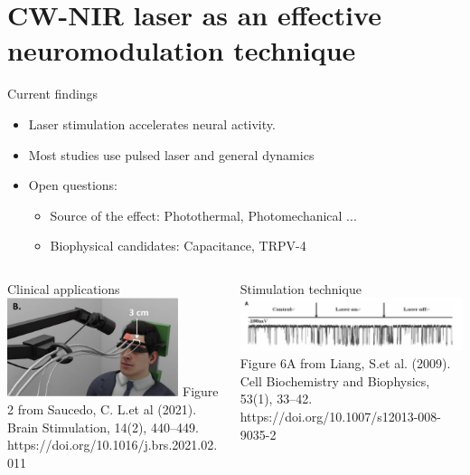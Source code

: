 \documentclass[aspectratio=43]{beamer}
\begin{document}
\section[CW-NIR Neuromodulation]{CW-NIR laser as an effective neuromodulation technique}
\begin{frame}{Current findings}
	\begin{itemize}
		\item{Laser stimulation accelerates neural activity.}
		\item{Most studies use pulsed laser and general dynamics}
		\item{Open questions:}
		\begin{itemize}
			\item Source of the effect: Photothermal, Photomechanical ...
			\item Biophysical candidates: Capacitance, TRPV-4 
		\end{itemize}
	\end{itemize}
	\vspace{10pt}
	\begin{columns}
		\begin{column}{0.5\textwidth}
			\centering
			Clinical applications\\
			\includegraphics[width=0.8\textwidth]{Images/saucedo.png} \tiny{Figure 2 from Saucedo, C. L.et al (2021). Brain Stimulation, 14(2), 440–449. https://doi.org/10.1016/j.brs.2021.02.011}
		\end{column}
		\begin{column}{0.5\textwidth}
			\centering
			Stimulation technique\\
			\includegraphics[width=\textwidth]{Images/liang.png} \tiny{Figure 6A from Liang, S.et al. (2009). Cell Biochemistry and Biophysics, 53(1), 33–42. https://doi.org/10.1007/s12013-008-9035-2
			}
		\end{column}	
	\end{columns}
	
	
\end{frame}
\end{document}
